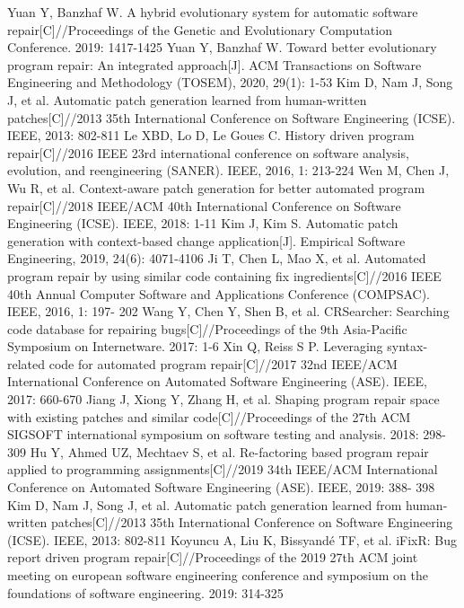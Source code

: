 \begin{thebibliography}{}
Yuan Y, Banzhaf W. A hybrid evolutionary system for automatic software repair[C]//Proceedings of the Genetic and Evolutionary Computation Conference. 2019: 1417-1425
Yuan Y, Banzhaf W. Toward better evolutionary program repair: An integrated approach[J]. ACM Transactions on Software Engineering and Methodology (TOSEM), 2020, 29(1): 1-53
Kim D, Nam J, Song J, et al. Automatic patch generation learned from human-written patches[C]//2013 35th International Conference on Software Engineering (ICSE). IEEE, 2013: 802-811
Le XBD, Lo D, Le Goues C. History driven program repair[C]//2016 IEEE 23rd international conference on software analysis, evolution, and reengineering (SANER). IEEE, 2016, 1: 213-224
Wen M, Chen J, Wu R, et al. Context-aware patch generation for better automated program repair[C]//2018 IEEE/ACM 40th International Conference on Software Engineering (ICSE). IEEE, 2018: 1-11
Kim J, Kim S. Automatic patch generation with context-based change application[J]. Empirical Software Engineering, 2019, 24(6): 4071-4106
Ji T, Chen L, Mao X, et al. Automated program repair by using similar code containing fix ingredients[C]//2016 IEEE 40th Annual Computer Software and Applications Conference (COMPSAC). IEEE, 2016, 1: 197- 202
Wang Y, Chen Y, Shen B, et al. CRSearcher: Searching code database for repairing bugs[C]//Proceedings of the 9th Asia-Pacific Symposium on Internetware. 2017: 1-6
Xin Q, Reiss S P. Leveraging syntax-related code for automated program repair[C]//2017 32nd IEEE/ACM International Conference on Automated Software Engineering (ASE). IEEE, 2017: 660-670
Jiang J, Xiong Y, Zhang H, et al. Shaping program repair space with existing patches and similar code[C]//Proceedings of the 27th ACM SIGSOFT international symposium on software testing and analysis. 2018: 298-309
Hu Y, Ahmed UZ, Mechtaev S, et al. Re-factoring based program repair applied to programming assignments[C]//2019 34th IEEE/ACM International Conference on Automated Software Engineering (ASE). IEEE, 2019: 388- 398
Kim D, Nam J, Song J, et al. Automatic patch generation learned from human-written patches[C]//2013 35th International Conference on Software Engineering (ICSE). IEEE, 2013: 802-811
Koyuncu A, Liu K, Bissyandé TF, et al. iFixR: Bug report driven program repair[C]//Proceedings of the 2019 27th ACM joint meeting on european software engineering conference and symposium on the foundations of software engineering. 2019: 314-325

\end{thebibliography}
